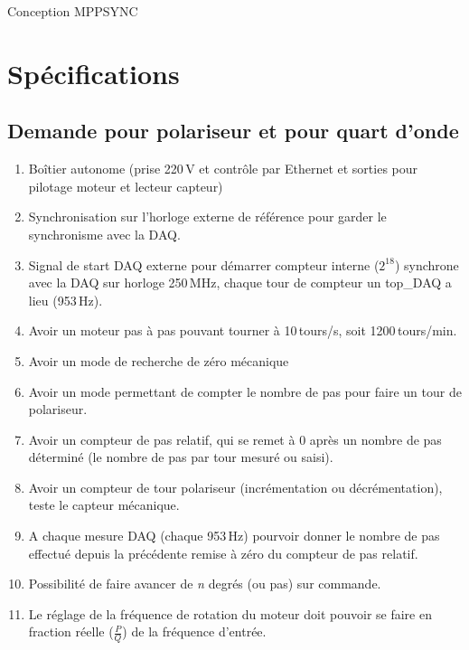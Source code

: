 \documentclass[11pt,a4paper,oneside,onecolumn]{article}
\begin{document}
\vspace*{.5 cm}
\begin{center} {\Large Conception MPPSYNC} \end{center}
\vspace*{.5 cm}
\tableofcontents

\section{Spécifications}
\subsection{Demande pour polariseur et pour quart d'onde}
\begin{enumerate}
\item Boîtier autonome (prise 220\,V et contrôle par Ethernet et sorties pour pilotage moteur et lecteur capteur)
\item Synchronisation sur l'horloge externe de référence pour garder le synchronisme avec la DAQ.
\item Signal de start DAQ externe pour démarrer compteur interne ($2^{18}$) synchrone avec la DAQ sur horloge 250\,MHz, chaque tour de compteur un top\_DAQ a lieu (953\,Hz).
\item Avoir un moteur pas à pas pouvant tourner à 10\,tours/s, soit 1200\,tours/min.
\item Avoir un mode de recherche de zéro mécanique
\item Avoir un mode permettant de compter le nombre de pas pour faire un tour de polariseur.
\item Avoir un compteur de pas relatif, qui se remet à 0 après un nombre de pas déterminé (le nombre de pas par tour mesuré ou saisi).
\item Avoir un compteur de tour polariseur (incrémentation ou décrémentation), teste le capteur mécanique.
\item A chaque mesure DAQ (chaque 953\,Hz) pourvoir donner le nombre de pas effectué depuis la précédente remise à zéro du compteur de pas relatif.
\item Possibilité de faire avancer de \emph{n} degrés (ou pas) sur commande.
\item Le réglage de la fréquence de rotation du moteur doit pouvoir se faire en fraction réelle ($\frac{P}{Q}$) de la fréquence d'entrée.

\end{enumerate}
\end{document}
